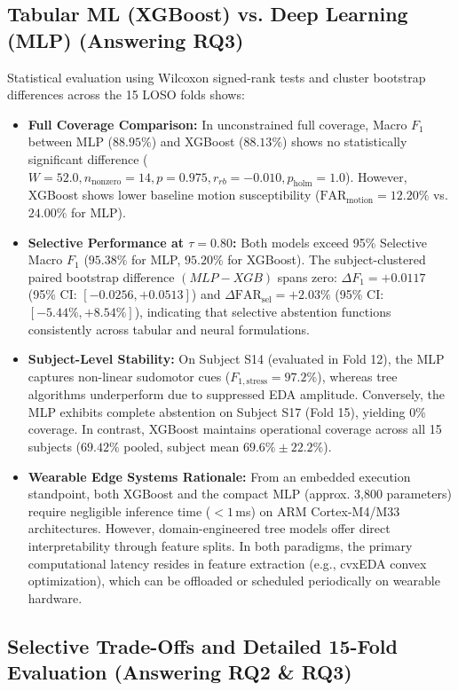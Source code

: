 \documentclass[conference]{IEEEtran}
\begin{document}
\subsection{Tabular ML (XGBoost) vs. Deep Learning (MLP) (Answering RQ3)}
Statistical evaluation using Wilcoxon signed-rank tests and cluster bootstrap differences across the 15 LOSO folds shows:
\begin{itemize}
    \item \textbf{Full Coverage Comparison:} In unconstrained full coverage, Macro $F_1$ between MLP ($88.95\%$) and XGBoost ($88.13\%$) shows no statistically significant difference ($W = 52.0, n_{\text{nonzero}} = 14, p = 0.975, r_{rb} = -0.010, p_{\text{holm}} = 1.0$). However, XGBoost shows lower baseline motion susceptibility ($\text{FAR}_{\text{motion}} = 12.20\%$ vs. $24.00\%$ for MLP).
    \item \textbf{Selective Performance at $\tau = 0.80$:} Both models exceed 95\% Selective Macro $F_1$ ($95.38\%$ for MLP, $95.20\%$ for XGBoost). The subject-clustered paired bootstrap difference $(MLP - XGB)$ spans zero: $\Delta F_1 = +0.0117$ (95\% CI: $[-0.0256, +0.0513]$) and $\Delta \text{FAR}_{\text{sel}} = +2.03\%$ (95\% CI: $[-5.44\%, +8.54\%]$), indicating that selective abstention functions consistently across tabular and neural formulations.
    \item \textbf{Subject-Level Stability:} On Subject S14 (evaluated in Fold 12), the MLP captures non-linear sudomotor cues ($F_{1,\text{stress}} = 97.2\%$), whereas tree algorithms underperform due to suppressed EDA amplitude. Conversely, the MLP exhibits complete abstention on Subject S17 (Fold 15), yielding 0\% coverage. In contrast, XGBoost maintains operational coverage across all 15 subjects ($69.42\%$ pooled, subject mean $69.6\% \pm 22.2\%$).
    \item \textbf{Wearable Edge Systems Rationale:} From an embedded execution standpoint, both XGBoost and the compact MLP (approx. 3,800 parameters) require negligible inference time ($< 1$\,ms) on ARM Cortex-M4/M33 architectures. However, domain-engineered tree models offer direct interpretability through feature splits. In both paradigms, the primary computational latency resides in feature extraction (e.g., cvxEDA convex optimization), which can be offloaded or scheduled periodically on wearable hardware.
\end{itemize}

\subsection{Selective Trade-Offs and Detailed 15-Fold Evaluation (Answering RQ2 \& RQ3)}
\end{document}
